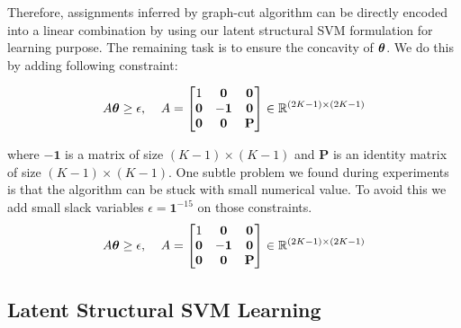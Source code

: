 Therefore, assignments inferred by graph-cut algorithm can be
directly encoded into a linear combination by using our latent
structural SVM formulation for learning purpose. The remaining
task is to ensure the concavity of ${\bm{\theta}}$. We do this by
adding following constraint:

\begin{align}
  \label{eq:concave_constraint}
  A{\bm{\theta}}\geq\epsilon \text{,\;~~~} A=
                  \begin{bmatrix}
                    1 & \mathbf{0} & \mathbf{0}\\
                    \mathbf{0} & -\mathbf{1} & \mathbf{0}\\
                    \mathbf{0} & \mathbf{0} & \mathbf{P}
                  \end{bmatrix}\in \mathbb{R}^{(2K-1)\times(2K-1)}
\end{align}

\noindent where $-\mathbf{1}$ is a matrix of size $(K-1)\times(K-1)$ and
$\mathbf{P}$ is an identity matrix of size $(K-1)\times(K-1)$.
One subtle problem we found during experiments is that the
algorithm can be stuck with small numerical value. To avoid this
we add small slack variables $\epsilon=\mathbf{1}^{-15}$ on 
those constraints.
\begin{align}
  \label{eq:concave_constraint}
  A{\bm{\theta}}\geq\epsilon \text{,\;~~~} A=
                  \begin{bmatrix}
                    1 & \mathbf{0} & \mathbf{0}\\
                    \mathbf{0} & -\mathbf{1} & \mathbf{0}\\
                    \mathbf{0} & \mathbf{0} & \mathbf{P}
                  \end{bmatrix}\in \mathbb{R}^{(2K-1)\times(2K-1)}
\end{align}

\subsection{Latent Structural SVM Learning}
\label{sec:mrflssvm_learning_algo}

